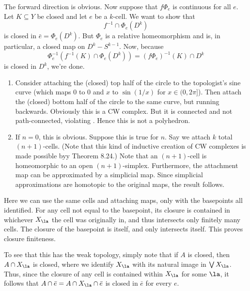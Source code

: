 \documentclass[../../solutions.tex]{subfiles}
\begin{document}
\begin{exercise} \leavevmode
The forward direction is obvious.
Now suppose that $f\Phi_e$ is continuous for all $e$.
Let $K\subseteq Y$ be closed and let $e$ be a $k$-cell.
We want to show that
\[f^{-1}\cap\Phi_e(D^k)\]
is closed in $\bar e=\Phi_e(D^k)$.
But $\Phi_e$ is a relative homeomorphism and is, in particular, a closed map on $D^k-S^{k-1}$.
Now, because
\[\Phi_e^{-1}(f^{-1}(K)\cap\Phi_e(D^k))=(f\Phi_e)^{-1}(K)\cap D^k\]
is closed in $D^k$, we're done.
\end{exercise}

\begin{exercise} \leavevmode
\begin{enumerate}
\item 
Consider attaching the (closed) top half of the circle to the topologist's sine curve (which maps 0 to 0 and $x$ to $\sin(1/x)$ for $x\in(0,2\pi]$).
Then attach the (closed) bottom half of the circle to the same curve, but running backwards.
Obviously this is a CW complex.
But it is connected and not path-connected, violating .
Hence this is not a polyhedron.

\item
If $n=0$, this is obvious.
Suppose this is true for $n$.
Say we attach $k$ total $(n+1)$-cells.
(Note that this kind of inductive creation of CW complexes is made possible byy Theorem 8.24.)
Note that an $(n+1)$-cell is homeomorphic to an open $(n+1)$-simplex.
Furthermore, the attachment map can be approximated by a simplicial map.
Since simplicial approximations are homotopic to the original maps, the result follows.
\end{enumerate}
\end{exercise}

\begin{exercise} \leavevmode
Here we can use the same cells and attaching maps, only with the basepoints all identified.
For any cell not equal to the basepoint, its closure is contained in whichever $X_\la$ the cell was originally in, and thus intersects only finitely many cells.
The closure of the basepoint is itself, and only intersects itself.
This proves closure finiteness.

To see that this has the weak topology, simply note that if $A$ is closed, then $A\cap X_\la$ is closed, where we identify $X_\la$ with its natural image in $\bigvee X_\la$.
Thus, since the closure of any cell is contained within $X_\la$ for some $\la$, it follows that $A\cap\bar e=A\cap X_\la\cap\bar e$ is closed in $\bar e$ for every $e$.
\end{exercise}
\end{document}
